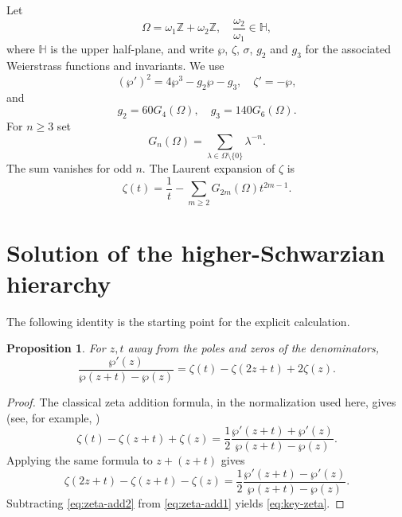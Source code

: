 \documentclass[11pt]{amsart}
\newtheorem{prop}[thm]{Proposition}
\theoremstyle{definition}
\theoremstyle{remark}
\numberwithin{equation}{section}
\begin{document}
Let
\[
\Omega=\omega_1\mathbb Z+\omega_2\mathbb Z,
\quad
\frac{\omega_2}{\omega_1}\in\mathbb H,
\]
where $\mathbb H$ is the upper half-plane, and write $\wp$, $\zeta$, $\sigma$, $g_2$ and $g_3$ for the associated Weierstrass functions and invariants. We use
\begin{equation}\label{eq:wp-equation}
(\wp')^2=4\wp^3-g_2\wp-g_3,
\quad
\zeta'=-\wp,
\end{equation}
and
\[
g_2=60G_4(\Omega),
\quad
g_3=140G_6(\Omega).
\]
For $n\geq3$ set
\begin{equation}\label{eq:Gn}
G_n(\Omega)
=
\sum_{\lambda\in\Omega\setminus\{0\}}\lambda^{-n}.
\end{equation}
The sum vanishes for odd $n$. The Laurent expansion of $\zeta$ is
\begin{equation}\label{eq:zeta-Laurent}
\zeta(t)
=
\frac1t-\sum_{m\geq2}G_{2m}(\Omega)t^{2m-1}.
\end{equation}

\section{Solution of the higher-Schwarzian hierarchy}\label{sec:elliptic-formula}

The following identity is the starting point for the explicit calculation.

\begin{prop}\label{prop:key-zeta}
For $z,t$ away from the poles and zeros of the denominators,
\begin{equation}\label{eq:key-zeta}
\frac{\wp'(z)}{\wp(z+t)-\wp(z)}
=
\zeta(t)-\zeta(2z+t)+2\zeta(z).
\end{equation}
\end{prop}

\begin{proof}
The classical zeta addition formula, in the normalization used here, gives
(see, for example, \cite{lang,weil})
\begin{equation}\label{eq:zeta-add1}
\zeta(t)-\zeta(z+t)+\zeta(z)
=
\frac12\frac{\wp'(z+t)+\wp'(z)}{\wp(z+t)-\wp(z)}.
\end{equation}
Applying the same formula to $z+(z+t)$ gives
\begin{equation}\label{eq:zeta-add2}
\zeta(2z+t)-\zeta(z+t)-\zeta(z)
=
\frac12\frac{\wp'(z+t)-\wp'(z)}{\wp(z+t)-\wp(z)}.
\end{equation}
Subtracting \eqref{eq:zeta-add2} from \eqref{eq:zeta-add1} yields \eqref{eq:key-zeta}.
\end{proof}
\end{document}
